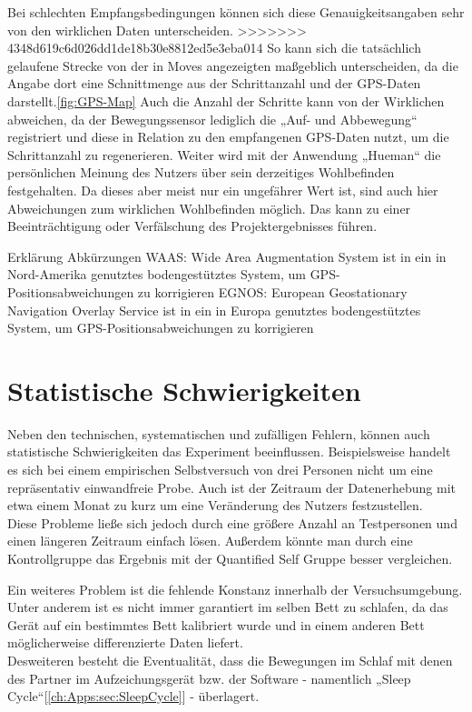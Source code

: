 Bei schlechten Empfangsbedingungen können sich diese Genauigkeitsangaben sehr von den wirklichen Daten unterscheiden.  
>>>>>>> 4348d619c6d026dd1de18b30e8812ed5e3eba014
So kann sich die tatsächlich gelaufene Strecke von der in Moves angezeigten maßgeblich unterscheiden, da die Angabe dort eine Schnittmenge aus der Schrittanzahl und der GPS-Daten darstellt.\ref{fig:GPS-Map}
Auch die Anzahl der Schritte kann von der Wirklichen abweichen, da der Bewegungssensor lediglich die „Auf- und Abbewegung“ registriert und diese in Relation zu den empfangenen GPS-Daten nutzt, um die Schrittanzahl zu regenerieren.
Weiter wird mit der Anwendung „Hueman“ die persönlichen Meinung des Nutzers über sein derzeitiges Wohlbefinden festgehalten. 
Da dieses aber meist nur ein ungefährer Wert ist, sind auch hier Abweichungen zum wirklichen Wohlbefinden möglich.
Das kann zu einer Beeinträchtigung oder Verfälschung des Projektergebnisses führen.



Erklärung Abkürzungen
WAAS: 
Wide Area Augmentation System ist in ein in Nord-Amerika genutztes bodengestütztes System, um GPS-Positionsabweichungen zu korrigieren
EGNOS: 
European Geostationary Navigation Overlay Service ist in ein in Europa genutztes bodengestütztes System, um GPS-Positionsabweichungen zu korrigieren


\section{Statistische Schwierigkeiten}
\label{ch:Relativierung:sec:StatistischeSchwierigkeiten}

Neben den technischen, systematischen und zufälligen Fehlern, können auch statistische Schwierigkeiten das Experiment beeinflussen.
Beispielsweise handelt es sich bei einem empirischen Selbstversuch von drei Personen nicht um eine repräsentativ einwandfreie Probe.
Auch ist der Zeitraum der Datenerhebung mit etwa einem Monat zu kurz um eine Veränderung des Nutzers festzustellen. \\
Diese Probleme ließe sich jedoch durch eine größere Anzahl an Testpersonen und einen längeren Zeitraum einfach lösen.
Außerdem könnte man durch eine Kontrollgruppe das Ergebnis mit der Quantified Self Gruppe besser vergleichen. 

Ein weiteres Problem ist die fehlende Konstanz innerhalb der Versuchsumgebung.
Unter anderem ist es nicht immer garantiert im selben Bett zu schlafen, da das Gerät auf ein bestimmtes Bett kalibriert wurde und in einem anderen Bett möglicherweise differenzierte Daten liefert.\\
Desweiteren besteht die Eventualität, dass die Bewegungen im Schlaf mit denen des Partner im Aufzeichungsgerät bzw. der Software - namentlich „Sleep Cycle“[\ref{ch:Apps:sec:SleepCycle}] - überlagert.

